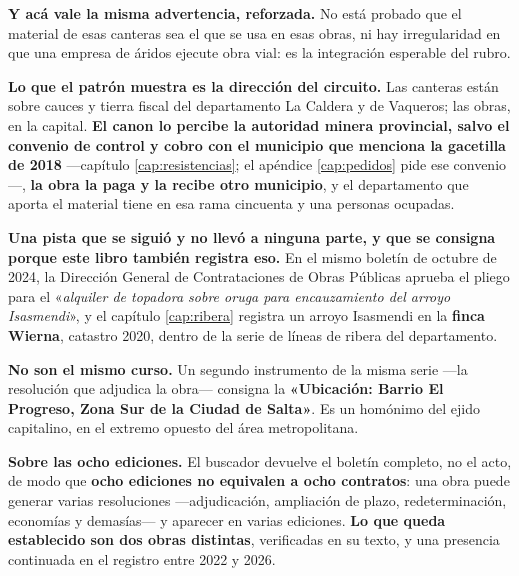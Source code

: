 \begin{cautela}
\textbf{Y acá vale la misma advertencia, reforzada.} No está probado que el material de esas
canteras sea el que se usa en esas obras, ni hay irregularidad en que una empresa de áridos
ejecute obra vial: es la integración esperable del rubro.

\textbf{Lo que el patrón muestra es la dirección del circuito.} Las canteras están sobre cauces
y tierra fiscal del departamento La Caldera y de Vaqueros; las obras, en la capital. \textbf{El canon lo percibe la autoridad minera provincial, salvo el convenio de control y cobro con el municipio que menciona la gacetilla de 2018} ---capítulo \ref{cap:resistencias}; el apéndice \ref{cap:pedidos} pide ese convenio---, \textbf{la obra la paga y la
recibe otro municipio}, y el departamento que aporta el material tiene en esa rama cincuenta y
una personas ocupadas.

\textbf{Una pista que se siguió y no llevó a ninguna parte, y que se consigna porque este libro
también registra eso.} En el mismo boletín de octubre de 2024, la Dirección General de
Contrataciones de Obras Públicas aprueba el pliego para el «\textit{alquiler de topadora sobre
oruga para encauzamiento del arroyo Isasmendi}», y el capítulo \ref{cap:ribera} registra un
arroyo Isasmendi en la \textbf{finca Wierna}, catastro 2020, dentro de la serie de líneas de
ribera del departamento.

\textbf{No son el mismo curso.} Un segundo instrumento de la misma serie ---la resolución que
adjudica la obra--- consigna la \textbf{«Ubicación: Barrio El Progreso, Zona Sur de la Ciudad de
Salta»}. Es un homónimo del ejido capitalino, en el extremo opuesto del área metropolitana.

\end{cautela}

\begin{cautela}
\textbf{Sobre las ocho ediciones.} El buscador devuelve el boletín completo, no el acto, de modo
que \textbf{ocho ediciones no equivalen a ocho contratos}: una obra puede generar varias
resoluciones ---adjudicación, ampliación de plazo, redeterminación, economías y demasías--- y
aparecer en varias ediciones. \textbf{Lo que queda establecido son dos obras distintas},
verificadas en su texto, y una presencia continuada en el registro entre 2022 y 2026.
\end{cautela}

